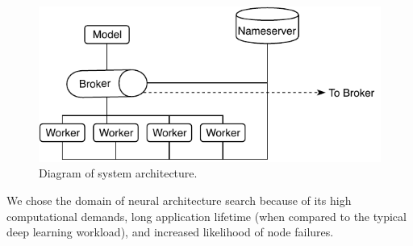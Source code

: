 \documentclass[conference]{IEEEtran}
\begin{document}
% 
\begin{figure}
  \centering
  \includegraphics[width=.85\columnwidth]{img/system-arch.pdf}
  \caption{Diagram of system architecture.}
  \label{fig:sys-arch}
\end{figure}
We chose the domain of neural architecture search because of its high
computational demands, long application lifetime (when compared to the
typical deep learning workload), and increased likelihood of node failures.
\end{document}
